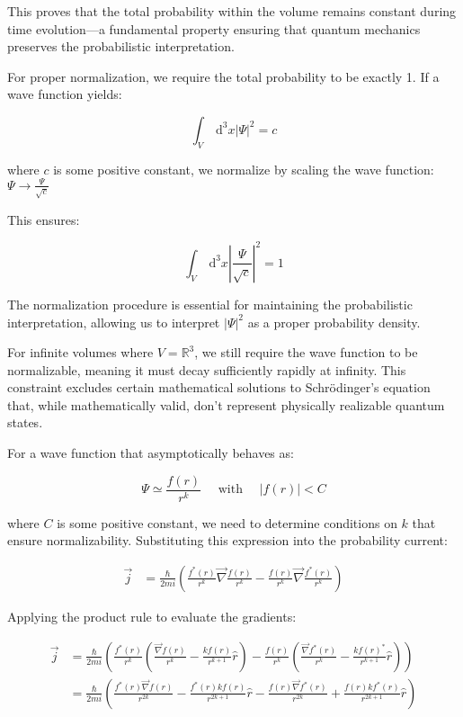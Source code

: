 \documentclass[italian]{HKNdocument}
\begin{document}
This proves that the total probability within the volume remains constant during time evolution—a fundamental property ensuring that quantum mechanics preserves the probabilistic interpretation.

For proper normalization, we require the total probability to be exactly 1. If a wave function yields:

\begin{equation}
\int_{V} \mathrm{~d}^{3} x|\Psi|^{2}=c \label{eq:1.38}
\end{equation}

where $c$ is some positive constant, we normalize by scaling the wave function:
$\Psi \rightarrow \frac{\Psi}{\sqrt{c}}$

This ensures:

\begin{equation}
\int_{V} \mathrm{~d}^{3} x\left|\frac{\Psi}{\sqrt{c}}\right|^{2}=1 \label{eq:1.39}
\end{equation}

The normalization procedure is essential for maintaining the probabilistic interpretation, allowing us to interpret $|\Psi|^2$ as a proper probability density.

For infinite volumes where $V=\mathbb{R}^{3}$, we still require the wave function to be normalizable, meaning it must decay sufficiently rapidly at infinity. This constraint excludes certain mathematical solutions to Schrödinger's equation that, while mathematically valid, don't represent physically realizable quantum states.


For a wave function that asymptotically behaves as:

\begin{equation}
\Psi \simeq \frac{f(r)}{r^{k}} \quad \text { with } \quad|f(r)|<C \label{eq:1.40}
\end{equation}

where $C$ is some positive constant, we need to determine conditions on $k$ that ensure normalizability. Substituting this expression into the probability current:

\begin{align}
\vec{j} &= \frac{\hbar}{2 m i}\left(\frac{f^{*}(r)}{r^{k}} \vec{\nabla} \frac{f(r)}{r^{k}}-\frac{f(r)}{r^{k}} \vec{\nabla} \frac{f^{*}(r)}{r^{k}}\right)
\end{align}

Applying the product rule to evaluate the gradients:

\begin{align}
\vec{j} &= \frac{\hbar}{2 m i}\left(\frac{f^{*}(r)}{r^{k}}\left(\frac{\vec{\nabla} f(r)}{r^{k}}-\frac{k f(r)}{r^{k+1}}\hat{r}\right)-\frac{f(r)}{r^{k}}\left(\frac{\vec{\nabla} f^{*}(r)}{r^{k}}-\frac{k f(r)^{*}}{r^{k+1}}\hat{r}\right)\right) \\
&= \frac{\hbar}{2 m i}\left(\frac{f^{*}(r) \vec{\nabla} f(r)}{r^{2 k}}-\frac{f^{*}(r) k f(r)}{r^{2 k+1}}\hat{r}-\frac{f(r) \vec{\nabla} f^{*}(r)}{r^{2 k}}+\frac{f(r) k f^{*}(r)}{r^{2 k+1}}\hat{r}\right) \label{eq:1.41}
\end{align}
\end{document}
